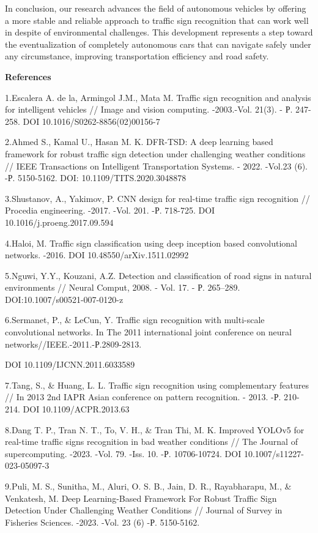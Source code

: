 In conclusion, our research advances the field of autonomous vehicles by
offering a more stable and reliable approach to traffic sign recognition
that can work well in despite of environmental challenges. This
development represents a step toward the eventualization of completely
autonomous cars that can navigate safely under any circumstance,
improving transportation efficiency and road safety.

{\bfseries References}

1.Escalera A. de la, Armingol J.M., Mata M. Traffic sign recognition and
analysis for intelligent vehicles // Image and vision computing.
-2003.-Vol. 21(3). - Р. 247-258. DOI 10.1016/S0262-8856(02)00156-7

2.Ahmed S., Kamal U., Hasan M. K. DFR-TSD: A deep learning based
framework for robust traffic sign detection under challenging weather
conditions // IEEE Transactions on Intelligent Transportation Systems. -
2022. -Vol.23 (6). -Р. 5150-5162. DOI: 10.1109/TITS.2020.3048878

3.Shustanov, A., Yakimov, P. CNN design for real-time traffic sign
recognition // Procedia engineering. -2017. -Vol. 201. -Р. 718-725. DOI
10.1016/j.proeng.2017.09.594

4.Haloi, M. Traffic sign classification using deep inception based
convolutional networks. -2016. DOI 10.48550/arXiv.1511.02992

5.Nguwi, Y.Y., Kouzani, A.Z. Detection and classification of road signs
in natural environments // Neural Comput, 2008. - Vol. 17. - Р.
265--289. DOI:10.1007/s00521-007-0120-z

6.Sermanet, P., \& LeCun, Y. Traffic sign recognition with multi-scale
convolutional networks. In The 2011 international joint conference on
neural networks//IEEE.-2011.-Р.2809-2813.

DOI 10.1109/IJCNN.2011.6033589

7.Tang, S., \& Huang, L. L. Traffic sign recognition using complementary
features // In 2013 2nd IAPR Asian conference on pattern recognition. -
2013. -Р. 210-214. DOI 10.1109/ACPR.2013.63

8.Dang T. P., Tran N. T., To, V. H., \& Tran Thi, M. K. Improved YOLOv5
for real-time traffic signs recognition in bad weather conditions // The
Journal of supercomputing. -2023. -Vol. 79. -Iss. 10. -Р. 10706-10724.
DOI 10.1007/s11227-023-05097-3

9.Puli, M. S., Sunitha, M., Aluri, O. S. B., Jain, D. R., Rayabharapu,
M., \& Venkatesh, M. Deep Learning-Based Framework For Robust Traffic
Sign Detection Under Challenging Weather Conditions // Journal of Survey
in Fisheries Sciences. -2023. -Vol. 23 (6) -Р. 5150-5162.

